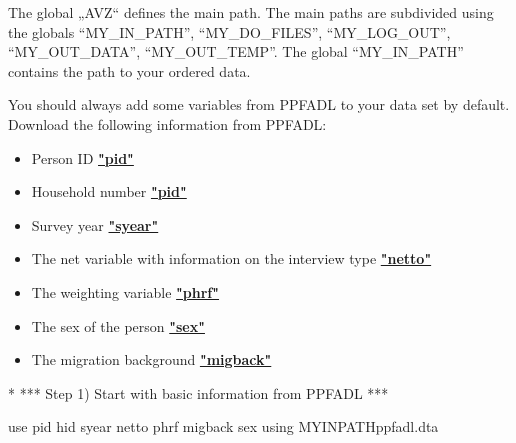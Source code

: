 \documentclass[letterpaper,10pt,openany,onesideH,english]{sphinxmanual}
\begin{document}
The global „AVZ“ defines the main path. The main paths are subdivided using the globals “MY\_IN\_PATH”, “MY\_DO\_FILES”, “MY\_LOG\_OUT”, “MY\_OUT\_DATA”, “MY\_OUT\_TEMP”. The global “MY\_IN\_PATH” contains the path to your ordered data.


You should always add some variables from PPFADL to your data set by default.
Download the following information from PPFADL:
\begin{itemize}
\item {} 
Person ID  \href{https://paneldata.org/soep-long/data/ppfadl/pid}{\textbf{"pid"}}

\item {} 
Household number  \href{https://paneldata.org/soep-long/data/ppfadl/pid}{\textbf{"pid"}}

\item {} 
Survey year  \href{https://paneldata.org/soep-long/data/ppfadl/syear}{\textbf{"syear"}}

\item {} 
The net variable with information on the interview type  \href{https://paneldata.org/soep-long/data/ppfadl/netto}{\textbf{"netto"}}

\item {} 
The weighting variable  \href{https://paneldata.org/soep-long/data/ppfadl/phrf}{\textbf{"phrf"}}

\item {} 
The sex of the person  \href{https://paneldata.org/soep-long/data/ppfadl/sex}{\textbf{"sex"}}

\item {} 
The migration background  \href{https://paneldata.org/soep-long/data/ppfadl/migback}{\textbf{"migback"}}

\end{itemize}

%
\begin{sphinxVerbatim}[commandchars=\\\{\},numbers=left,firstnumber=1,stepnumber=1]
*\PYGZhy{}\PYGZhy{}\PYGZhy{}\PYGZhy{}\PYGZhy{}\PYGZhy{}\PYGZhy{}\PYGZhy{}\PYGZhy{}\PYGZhy{}\PYGZhy{}\PYGZhy{}\PYGZhy{}\PYGZhy{}\PYGZhy{}\PYGZhy{}\PYGZhy{}\PYGZhy{}\PYGZhy{}\PYGZhy{}\PYGZhy{}\PYGZhy{}\PYGZhy{}\PYGZhy{}\PYGZhy{}\PYGZhy{}\PYGZhy{}\PYGZhy{}\PYGZhy{}\PYGZhy{}\PYGZhy{}\PYGZhy{}\PYGZhy{}\PYGZhy{}\PYGZhy{}\PYGZhy{}\PYGZhy{}\PYGZhy{}\PYGZhy{}\PYGZhy{}\PYGZhy{}\PYGZhy{}\PYGZhy{}\PYGZhy{}\PYGZhy{}\PYGZhy{}\PYGZhy{}\PYGZhy{}\PYGZhy{}\PYGZhy{}\PYGZhy{}\PYGZhy{}\PYGZhy{}\PYGZhy{}\PYGZhy{}\PYGZhy{}\PYGZhy{}\PYGZhy{}\PYGZhy{}\PYGZhy{}\PYGZhy{}\PYGZhy{}\PYGZhy{}\PYGZhy{}\PYGZhy{}\PYGZhy{}\PYGZhy{}\PYGZhy{}\PYGZhy{}\PYGZhy{}\PYGZhy{}\PYGZhy{}\PYGZhy{}\PYGZhy{}\PYGZhy{}\PYGZhy{}\PYGZhy{}\PYGZhy{}\PYGZhy{}
*** Step 1) Start with basic information from PPFADL ***

use pid hid syear netto phrf migback sex using \PYGZdl{}\PYGZob{}MY\PYGZus{}IN\PYGZus{}PATH\PYGZcb{}\PYGZbs{}ppfadl.dta 
\end{sphinxVerbatim}
\end{document}
